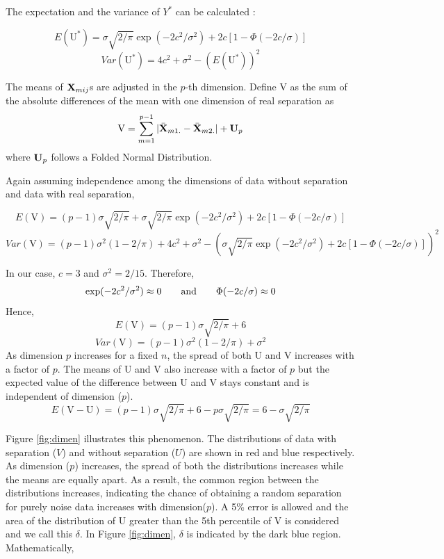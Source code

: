 The expectation and the variance of $Y^*$ can be calculated :

$$E(\mbox{U}^*) = \sigma \sqrt{2/\pi} \exp(- 2c^2/\sigma^2) + 2c[1 - \Phi(-2c/\sigma)]$$
$$Var(\mbox{U}^*) = 4c^2 + \sigma^2 - (E(\mbox{U}^*))^2$$


The means of ${\bf{X}}_{mij}$s are adjusted in the $p$-th dimension. Define $\mbox{V}$ as the sum of the absolute differences of the mean with one dimension of real separation as $$\mbox{V} = \sum_{m=1}^{p-1} |\bar{{\bf{X}}}_{m1.} - \bar{{\bf{X}}}_{m2.}| + {\bf{U}}_p$$ where ${\bf{U}}_p$ follows a Folded Normal Distribution.

Again assuming independence among the dimensions of data without separation and data with real separation,

$$E(\mbox{V}) = (p - 1) \sigma \sqrt{2/\pi} + \sigma \sqrt{2/\pi} \exp(- 2c^2/\sigma^2) + 2c[1 - \Phi(-2c/\sigma)]$$
$$Var(\mbox{V}) = (p - 1)\sigma^2 (1 - 2/\pi) + 4c^2 + \sigma^2 - \left( \sigma \sqrt{2/\pi} \exp(- 2c^2/\sigma^2) + 2c[1 - \Phi(-2c/\sigma)]\right)^2$$

In our case, $c = 3$ and $\sigma^2 = 2/15$. Therefore,
$$\exp(- 2c^2/\sigma^2) \approx 0 \qquad \hbox{and} \qquad \Phi(-2c/\sigma) \approx 0$$
Hence,
$$E(\mbox{V}) = (p - 1) \sigma \sqrt{2/\pi} + 6$$
$$Var(\mbox{V}) = (p - 1)\sigma^2 (1 - 2/\pi) + \sigma^2$$
As dimension $p$ increases for a fixed $n$, the spread of both U and V increases with a factor of $p$. The means of U and V also increase with a factor of $p$ but the expected value of the difference between U and V stays constant and is independent of dimension ($p$). 
$$E (\mbox{V} - \mbox{U}) = (p - 1) \sigma \sqrt{2/\pi} + 6 - p \sigma \sqrt{2/\pi} = 6 - \sigma \sqrt{2/\pi}$$


Figure \ref{fig:dimen} illustrates this phenomenon. The distributions of data with separation ($V$) and without separation ($U$) are shown in red and blue respectively. As dimension ($p$) increases, the spread of both the distributions increases while the means are equally apart. As a result, the common region between the distributions increases, indicating the chance of obtaining a random separation for purely noise data increases with dimension($p$). A 5\% error is allowed and the area of the distribution of U greater than the 5th percentile of V is considered and we call this $\delta$. In Figure \ref{fig:dimen}, $\delta$ is indicated by the dark blue region. Mathematically, 

